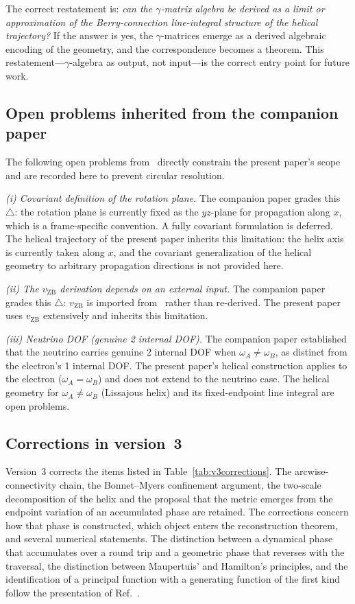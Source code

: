 \documentclass[%
 reprint, amsmath,amssymb, aps, prb, ]{revtex4-2}
\numberwithin{equation}{section}
\begin{document}
The correct restatement is: \emph{can the $\gamma$-matrix algebra be derived as a limit or approximation of the Berry-connection line-integral structure of the helical trajectory?} If the answer is yes, the $\gamma$-matrices emerge as a derived algebraic encoding of the geometry, and the correspondence becomes a theorem. This restatement---$\gamma$-algebra as output, not input---is the correct entry point for future work.

\subsection{Open problems inherited from the companion paper}
\label{app:inherited}
The following open problems from~\cite{hanamura50} directly constrain the present paper's scope and are recorded here to prevent circular resolution.

\textit{(i) Covariant definition of the rotation plane.} The companion paper grades this $\triangle$: the rotation plane is currently fixed as the $yz$-plane for propagation along $x$, which is a frame-specific convention. A fully covariant formulation is deferred. The helical trajectory of the present paper inherits this limitation: the helix axis is currently taken along $x$, and the covariant generalization of the helical geometry to arbitrary propagation directions is not provided here.

\textit{(ii) The $v_\mathrm{ZB}$ derivation depends on an external input.} The companion paper grades this $\triangle$: $v_\mathrm{ZB}$ is imported from~\cite{hanamura10} rather than re-derived. The present paper uses $v_\mathrm{ZB}$ extensively and inherits this limitation.

\textit{(iii) Neutrino DOF (genuine 2 internal DOF).} The companion paper established that the neutrino carries genuine 2 internal DOF when $\omega_A\neq\omega_B$, as distinct from the electron's 1 internal DOF. The present paper's helical construction applies to the electron ($\omega_A=\omega_B$) and does not extend to the neutrino case. The helical geometry for $\omega_A\neq\omega_B$ (Lissajous helix) and its fixed-endpoint line integral are open problems.

\subsection{Corrections in version~3}
\label{app:v3}

Version~3 corrects the items listed in Table~\ref{tab:v3corrections}. The arcwise-connectivity chain, the Bonnet--Myers confinement argument, the two-scale decomposition of the helix and the proposal that the metric emerges from the endpoint variation of an accumulated phase are retained. The corrections concern how that phase is constructed, which object enters the reconstruction theorem, and several numerical statements. The distinction between a dynamical phase that accumulates over a round trip and a geometric phase that reverses with the traversal, the distinction between Maupertuis' and Hamilton's principles, and the identification of a principal function with a generating function of the first kind follow the presentation of Ref.~\cite{Yukawa1954}.
\end{document}
